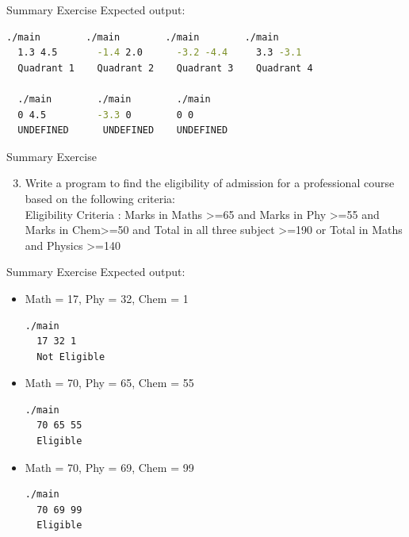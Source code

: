 \documentclass[10pt,xcolor={table,dvipsnames},t]{beamer}
\begin{document}
\begin{frame}[fragile]{Summary Exercise}
  Expected output:
\begin{lstlisting}[language=bash]
  ./main        ./main        ./main        ./main
  1.3 4.5       -1.4 2.0      -3.2 -4.4     3.3 -3.1
  Quadrant 1    Quadrant 2    Quadrant 3    Quadrant 4

  ./main        ./main        ./main        
  0 4.5         -3.3 0        0 0     
  UNDEFINED      UNDEFINED    UNDEFINED
\end{lstlisting}
\end{frame}

\begin{frame}{Summary Exercise}

  \begin{enumerate}
    \setcounter{enumi}{2}
    \item Write a program to find the eligibility of admission for a professional course based on the following criteria:\\
    \vspace{1mm}
    Eligibility Criteria : Marks in Maths >=65 and Marks in Phy >=55 and Marks in Chem>=50 and Total in all three subject >=190 or Total in Maths and Physics >=140 
  \end{enumerate}
\end{frame}

\begin{frame}[fragile]{Summary Exercise}
  Expected output:
  \begin{itemize}
    \item Math = 17, Phy = 32, Chem = 1
\begin{lstlisting}[language=bash]
  ./main
  17 32 1
  Not Eligible
\end{lstlisting}
    \item Math = 70, Phy = 65, Chem = 55
\begin{lstlisting}[language=bash]
  ./main
  70 65 55
  Eligible
\end{lstlisting}
    \item Math = 70, Phy = 69, Chem = 99
\begin{lstlisting}[language=bash]
  ./main
  70 69 99
  Eligible
\end{lstlisting}
  \end{itemize}
\end{frame}
\end{document}
